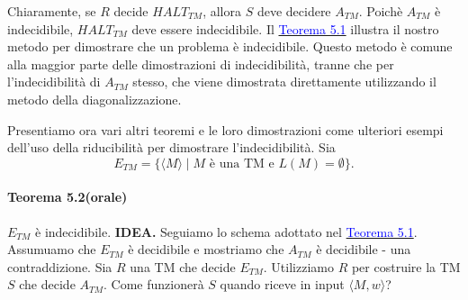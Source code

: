 \documentclass{article}
\begin{document}
Chiaramente, se $R$ decide $HALT_{TM}$, allora $S$ deve decidere $A_{TM}$.
Poichè $A_{TM}$ è indecidibile, $HALT_{TM}$ deve essere indecidibile.
\vspace{1em}
\text{}
\newline
Il \hyperref[teorema-5.1]{\textcolor{blue}{Teorema 5.1}} illustra il nostro metodo per dimostrare che un problema è indecidibile.
Questo metodo è comune alla maggior parte delle dimostrazioni di indecidibilità, tranne che per l'indecidibilità di $A_{TM}$ stesso, che viene dimostrata direttamente utilizzando il metodo della diagonalizzazione.

Presentiamo ora vari altri teoremi e le loro dimostrazioni come ulteriori esempi dell'uso della riducibilità per dimostrare l'indecidibilità.
Sia
$$
E_{TM} = \{\langle M \rangle \mid M \text{ è una TM e } L(M) = \emptyset \}.
$$
\paragraph{Teorema 5.2(orale)}
\label{teorema-5.2}
\text{}
\newline
$E_{TM}$ è indecidibile.
\vspace{1em}
\text{}
\newline
\hbox{\textbf{IDEA.}}
Seguiamo lo schema adottato nel \hyperref[teorema-5.1]{\textcolor{blue}{Teorema 5.1}}.
Assumuamo che $E_{TM}$ è decidibile e mostriamo che $A_{TM}$ è decidibile - una contraddizione.
Sia $R$ una TM che decide $E_{TM}$.
Utilizziamo $R$ per costruire la TM $S$ che decide $A_{TM}$.
Come funzionerà $S$ quando riceve in input $\langle M,w \rangle$?
\end{document}
